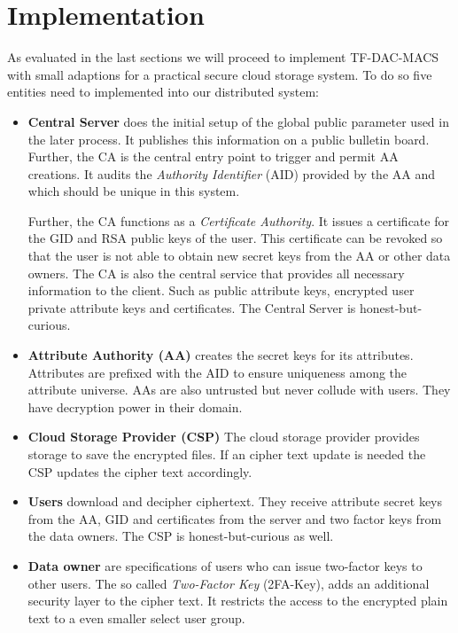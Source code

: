 \chapter{Implementation}
As evaluated in the last sections we will proceed to implement TF-DAC-MACS with small adaptions for a practical secure cloud storage system. To do so five entities need to implemented into our distributed system:  

\begin{itemize}
  \item \textbf{Central Server} does the initial setup of the global public parameter used in the later process. It publishes this information on a public bulletin board. Further, the CA is the central entry point to trigger and permit AA creations. It audits the \textit{Authority Identifier} (\ac{AID}) provided by the AA and which should be unique in this system. 

Further, the CA functions as a \textit{Certificate Authority}. It issues a certificate for the GID and RSA public keys of the user. This certificate can be revoked so that the user is not able to obtain new secret keys from the AA or other data owners.
The CA is also the central service that provides all necessary information to the client. Such as public attribute keys, encrypted user private attribute keys and certificates.
 The Central Server is honest-but-curious.
  \item \textbf{Attribute Authority (\ac{AA})} creates the secret keys for its attributes. Attributes are prefixed with the \ac{AID} to ensure uniqueness among the attribute universe. AAs are also untrusted but never collude with users. They have decryption power in their domain. 
  \item \textbf{Cloud Storage Provider (\ac{CSP})} The cloud storage provider provides storage to save the encrypted files. If an cipher text update is needed the CSP updates the cipher text accordingly. 
  \item \textbf{Users} download and decipher ciphertext. They receive attribute secret keys from the AA, GID and certificates from the server and two factor keys from the data owners. The CSP is honest-but-curious as well.
  \item \textbf{Data owner} are specifications of users who can issue two-factor keys to other users. The so called \textit{Two-Factor Key} (\ac{2FA}-Key), adds an additional security layer to the cipher text. It restricts the access to the encrypted plain text to a even smaller select user group.  
\end{itemize}

